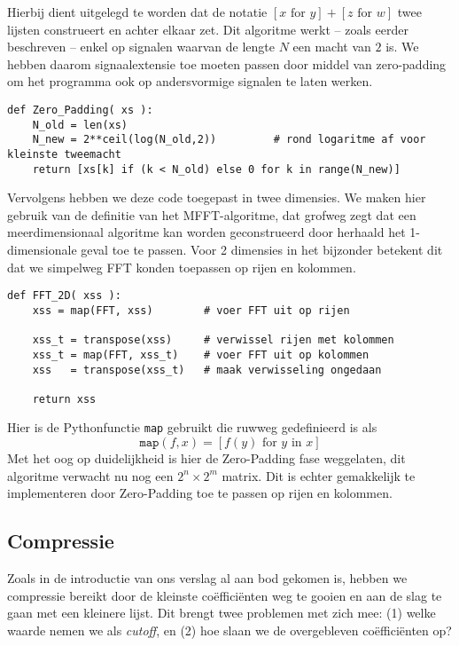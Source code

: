 Hierbij dient uitgelegd te worden dat de notatie $[x \text{ for } y] + [z \text{ for } w]$ twee lijsten construeert en achter elkaar zet. Dit algoritme werkt -- zoals eerder beschreven -- enkel op signalen waarvan de lengte
$N$ een macht van $2$ is. We hebben daarom signaalextensie toe moeten passen door middel van zero-padding
om het programma ook op andersvormige signalen te laten werken.

\begin{lstlisting}[caption={Zero-padding algoritme in Python, voegt nullen toe tot een tweemacht is bereikt}]
def Zero_Padding( xs ):
    N_old = len(xs)
    N_new = 2**ceil(log(N_old,2))         # rond logaritme af voor kleinste tweemacht
    return [xs[k] if (k < N_old) else 0 for k in range(N_new)]
\end{lstlisting}

Vervolgens hebben we deze code toegepast in twee dimensies. We maken hier gebruik van de definitie van het
MFFT-algoritme, dat grofweg zegt dat een meerdimensionaal algoritme kan worden geconstrueerd door herhaald 
het 1-dimensionale geval toe te passen. Voor 2 dimensies in het bijzonder betekent dit dat we simpelweg 
FFT konden toepassen op rijen en kolommen.

\begin{lstlisting}[caption=2-Dimensionaal FFT algoritme]
def FFT_2D( xss ):
    xss = map(FFT, xss)        # voer FFT uit op rijen

    xss_t = transpose(xss)     # verwissel rijen met kolommen
    xss_t = map(FFT, xss_t)    # voer FFT uit op kolommen
    xss   = transpose(xss_t)   # maak verwisseling ongedaan 

    return xss
\end{lstlisting}
Hier is de Pythonfunctie \texttt{map} gebruikt die ruwweg gedefinieerd is als 
\[
	\texttt{map}(f,x) = [f(y) \text{ for } y \text{ in } x]
\]
Met het oog op duidelijkheid is hier de Zero-Padding fase weggelaten, 
dit algoritme verwacht nu nog een $2^n \times 2^m$ matrix.
Dit is echter gemakkelijk te implementeren door Zero-Padding toe te passen op rijen en kolommen.

\subsection{Compressie}
Zoals in de introductie van ons verslag al aan bod gekomen is, hebben we compressie bereikt door de kleinste 
co\"effici\"enten weg te gooien en aan de slag te gaan met een kleinere lijst. 
Dit brengt twee problemen met zich mee: (1) welke waarde nemen we als \emph{cutoff}, 
en (2) hoe slaan we de overgebleven co\"effici\"enten op?
